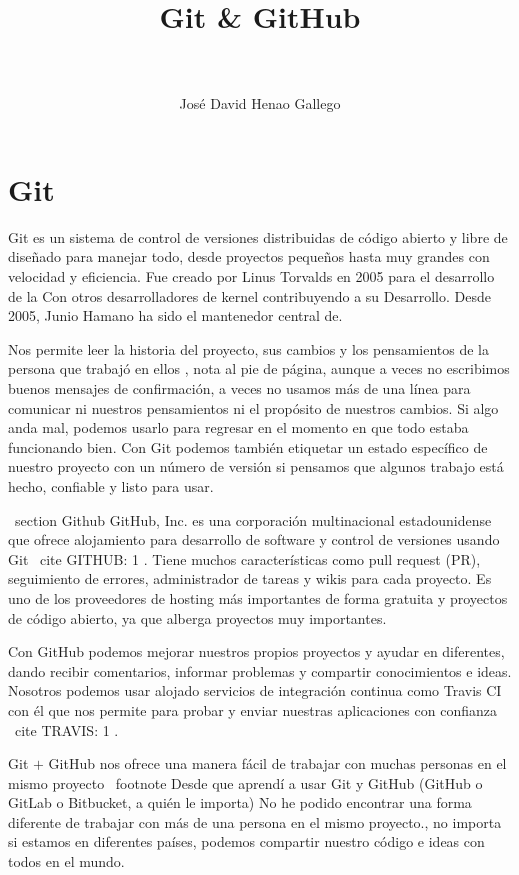 \documentclass[a4paper,11pt]{article}
\title{Git \& GitHub}
\author{\\\\ José David Henao Gallego}
\begin{document}
\maketitle
\tableofcontents

\section{Git}
Git es un sistema de control de versiones distribuidas de código abierto y libre
de diseñado para manejar todo, desde proyectos pequeños hasta muy grandes con
velocidad y eficiencia. Fue creado por Linus Torvalds en 2005 para el desarrollo
de la Con otros desarrolladores de kernel contribuyendo a su  Desarrollo. Desde
2005, Junio Hamano ha sido el mantenedor central de.

Nos permite leer la historia del proyecto, sus cambios y los pensamientos de la
persona que trabajó en ellos , nota al pie de página, aunque a veces no
escribimos buenos mensajes de confirmación, a veces no usamos más de una línea
para comunicar ni nuestros pensamientos ni el propósito de nuestros cambios. Si
algo anda mal, podemos usarlo para regresar en el momento en que todo estaba
funcionando bien. Con Git podemos también etiquetar un estado específico de
nuestro proyecto con un número de versión si pensamos que algunos trabajo está
hecho, confiable y listo para usar.

\ section { Github }
GitHub, Inc. es una corporación multinacional estadounidense que ofrece alojamiento para 
desarrollo de software y control de versiones usando Git \ cite { GITHUB: 1 }. Tiene muchos
características como pull request (PR), seguimiento de errores, administrador de tareas y wikis para 
cada proyecto. Es uno de los proveedores de hosting más importantes de forma gratuita y
proyectos de código abierto, ya que alberga proyectos muy importantes.

Con GitHub podemos mejorar nuestros propios proyectos y ayudar en diferentes, dando 
recibir comentarios, informar problemas y compartir conocimientos e ideas. Nosotros podemos usar
alojado servicios de integración continua como Travis CI con él que nos permite
para probar y enviar nuestras aplicaciones con confianza \ cite { TRAVIS: 1 }.

Git $ + $ GitHub nos ofrece una manera fácil de trabajar con muchas personas en el mismo proyecto
\ footnote {Desde que aprendí a usar Git y GitHub (GitHub o GitLab o
Bitbucket, a quién le importa) No he podido encontrar una forma diferente de trabajar con 
más de una persona en el mismo proyecto.}, no importa si estamos en 
diferentes países, podemos compartir nuestro código e ideas con todos en el mundo.
\end{document}
